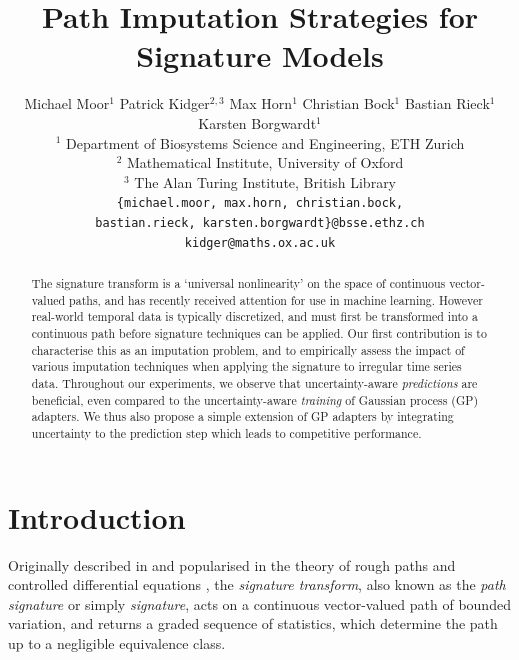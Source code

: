\documentclass{article}
\title{Path Imputation Strategies for Signature Models}
\author{
    Michael Moor$^1$
    \And
	Patrick Kidger$^{2, 3}$
	\And
	Max Horn$^1$
	\And
	Christian Bock$^1$
	\And
	Bastian Rieck$^1$
	\And
	Karsten Borgwardt$^1$
	\AND \\[-12pt]
	\null$^1$ Department of Biosystems Science and Engineering, ETH Zurich
	\\
	\null$^2$ Mathematical Institute, University of Oxford \\
	\null$^3$ The Alan Turing Institute, British Library
	\\
	\hspace{-6.5em}\texttt{\{michael.moor, max.horn, christian.bock,}
	\\
	\hspace{6.5em}\texttt{bastian.rieck, karsten.borgwardt\}@\hspace{0.1pt}bsse.ethz.ch}
	\\
	\texttt{kidger@\hspace{0.1pt}maths.ox.ac.uk}
} %
\begin{document}
\maketitle

\begin{abstract}
The signature transform is a `universal nonlinearity' on the space of continuous vector-valued paths, and has recently received attention for use in machine learning. However real-world temporal data is typically discretized, and must first be transformed into a continuous path before signature techniques can be applied. %
Our first contribution is to characterise this as an imputation problem, and to empirically assess the impact of various imputation techniques when applying the signature to irregular time series data. Throughout our experiments, we observe that uncertainty-aware \emph{predictions} are beneficial, even compared to the uncertainty-aware \emph{training} of Gaussian process (GP) adapters. We thus also propose a simple extension of GP adapters by integrating uncertainty to the prediction step which leads to competitive performance.
\end{abstract} %


\section{Introduction}\label{intro}
Originally described in \cite{Chen54, Chen57, Chen58} and popularised in the theory of rough paths and controlled differential equations \cite{lyons1998differential, FritzVictoir10, lyons2014rough}, the \emph{signature transform}, also known as the \emph{path signature} or simply \emph{signature}, acts on a continuous vector-valued path of bounded variation, and returns a graded sequence of statistics, which determine the path up to a negligible equivalence class.
\end{document}
